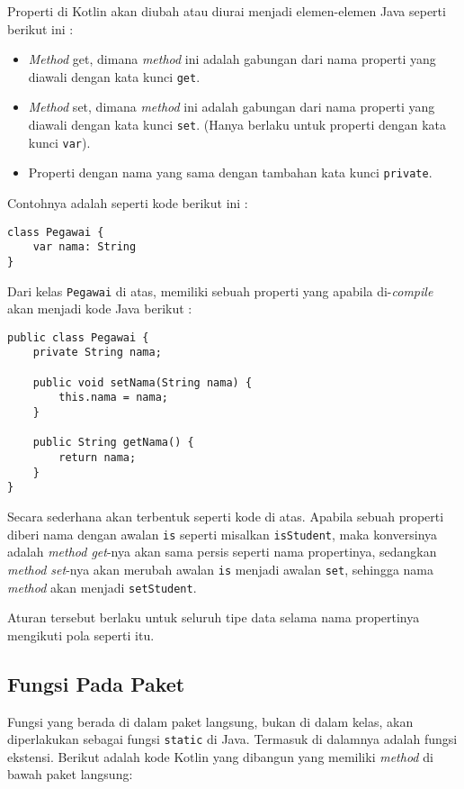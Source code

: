 Properti di Kotlin akan diubah atau diurai menjadi elemen-elemen Java seperti berikut ini :

\begin{itemize}
	\item \textit{Method} get, dimana \textit{method} ini adalah gabungan dari nama properti yang diawali dengan kata kunci \texttt{get}.
	\item \textit{Method} set, dimana \textit{method} ini adalah gabungan dari nama properti yang diawali dengan kata kunci \texttt{set}. (Hanya berlaku untuk properti dengan kata kunci \texttt{var}).
	\item Properti dengan nama yang sama dengan tambahan kata kunci \texttt{private}.
\end{itemize}

Contohnya adalah seperti kode berikut ini :

\begin{lstlisting}
class Pegawai {
	var nama: String
}
\end{lstlisting}

Dari kelas \texttt{Pegawai} di atas, memiliki sebuah properti yang apabila di-\textit{compile} akan menjadi kode Java berikut :

\begin{lstlisting}
public class Pegawai {
	private String nama;
	
	public void setNama(String nama) {
		this.nama = nama;
	}
	
	public String getNama() {
		return nama;
	}
}
\end{lstlisting}

Secara sederhana akan terbentuk seperti kode di atas. Apabila sebuah properti diberi nama dengan awalan \texttt{is} seperti misalkan \texttt{isStudent}, maka konversinya adalah \textit{method get}-nya akan sama persis seperti nama propertinya, sedangkan \textit{method set}-nya akan merubah awalan \texttt{is} menjadi awalan \texttt{set}, sehingga nama \textit{method} akan menjadi \texttt{setStudent}. 

Aturan tersebut berlaku untuk seluruh tipe data selama nama propertinya mengikuti pola seperti itu.

\subsection{Fungsi Pada Paket}

Fungsi yang berada di dalam paket langsung, bukan di dalam kelas, akan diperlakukan sebagai fungsi \texttt{static} di Java. Termasuk di dalamnya adalah fungsi ekstensi. Berikut adalah kode Kotlin yang dibangun yang memiliki \textit{method} di bawah paket langsung:

